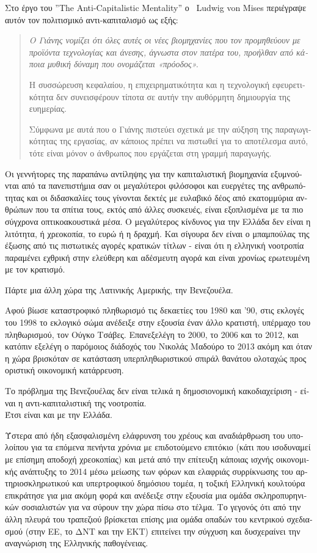 \documentclass[11pt, twocolumn]{scrartcl}
\newenvironment{italicquotes}
{\begin{quote}\itshape}
{\end{quote}}
\begin{document}
\begin{otherlanguage}{greek}
Στο έργο του \latintext''The Anti-Capitalistic Mentality'' \greektext ο \latintext\ Ludwig von Mises \greektext περιέγραψε αυτόν τον πολιτισμικό αντι-καπιταλισμό ως εξής:
\begin{italicquotes}
Ο Γιάνης νομίζει ότι όλες αυτές οι νέες βιομηχανίες που τον προμηθεύουν με προϊόντα τεχνολογίας και άνεσης, άγνωστα στον πατέρα του, προήλθαν από κάποια μυθική δύναμη που ονομάζεται «πρόοδος».

Η συσσώρευση κεφαλαίου, η επι\-χει\-ρη\-μα\-τι\-κό\-τη\-τα και η τεχνολογική εφευρετικότητα δεν συνεισφέρουν τίποτα σε αυτήν την αυθόρμητη δημιουργία της ευημερίας.

Σύμφωνα με αυτά που ο Γιάνης πιστεύει σχετικά με την αύξηση της παραγωγικότητας της εργασίας, αν κάποιος πρέπει να πιστωθεί για το αποτέλεσμα αυτό, τότε είναι μόνον ο άνθρωπος που εργάζεται στη γραμμή παραγωγής.
\end{italicquotes}

Οι γεννήτορες της παραπάνω αντίληψης για την καπιταλιστική βιομηχανία ε\-ξυ\-μνού\-νται από τα πανεπιστήμια σαν οι μεγαλύτεροι φιλόσοφοι και ευεργέτες της ανθρωπότητας και οι διδασκαλίες τους γίνονται δεκτές με ευλαβικό δέος από εκατομμύρια ανθρώπων που τα σπίτια τους, εκτός από άλλες συσκευές, είναι εξοπλισμένα με τα πιο σύγχρονα οπτικοακουστικά μέσα.
Ο μεγαλύτερος κίνδυνος για την Ελλάδα δεν είναι η λιτότητα, ή χρεοκοπία, το ευρώ ή η δραχμή. Και σίγουρα δεν είναι ο μπαμπούλας της έξωσης από τις πιστωτικές αγορές κρατικών τίτλων - είναι ότι η ελληνική νοοτροπία παραμένει εχθρική στην ελεύθερη και αδέσμευτη αγορά και είναι χρονίως ερωτευμένη με τον κρατισμό.

Πάρτε μια άλλη χώρα της Λατινικής Αμερικής, την  Βενεζουέλα.

Αφού βίωσε καταστροφικό πληθωρισμό τις δεκαετίες του 1980 και '90, στις εκλογές του 1998 το εκλογικό σώμα ανέδειξε στην εξουσία έναν άλλο κρατιστή, υπέρμαχο του πληθωρισμού, τον Ούγκο Τσάβες. Επανεξελέγη το 2000, το 2006 και το 2012, και κατόπιν εξελέγη ο παρόμοιος διάδοχός του Νικολάς Μαδούρο το 2013 ακόμη και όταν η χώρα βρισκόταν σε κατάσταση υπερπληθωριστικού σπιράλ θανάτου ολοταχώς προς οριστική οικονομική κατάρρευση.

Το πρόβλημα της Βενεζουέλας δεν είναι τελικά η δημοσιονομική κακοδιαχείριση - είναι η αντι-καπιταλιστική της νοοτροπία.
\\Έτσι είναι και με την Ελλάδα.

Ύστερα από ήδη εξασφαλισμένη ελά\-φρυ\-νση του χρέους και αναδιάρθρωση του υπολοίπου για τα επόμενα πενήντα χρόνια με επιδοτούμενο επιτόκιο (κάτι που ισοδυναμεί με επίσημη αποδοχή χρεοκοπίας) και μετά από την επίτευξη κάποιας ισχνής οικονομικής ανάπτυξης το 2014 μέσω μείωσης των φόρων και ελαφριάς συρρίκνωσης του  αρτηριοσκληρωτικού και υπερτροφικού δημόσιου τομέα, η τοξική Ελληνική κουλτούρα επικράτησε για μια ακόμη φορά και ανέδειξε στην εξουσία μια ομάδα σκληροπυρηνικών σοσιαλιστών για να σύρουν την χώρα πίσω στο τέλμα.
Το γεγονός ότι από την άλλη πλευρά του τραπεζιού βρίσκεται επίσης μια ομάδα οπαδών του κεντρικού σχεδιασμού (στην ΕΕ, το ΔΝΤ και την ΕΚΤ) επιτείνει την σύγχυση και δυσχεραίνει την αναγνώριση της Ελληνικής παθογένειας.


\end{otherlanguage}
\end{document}
